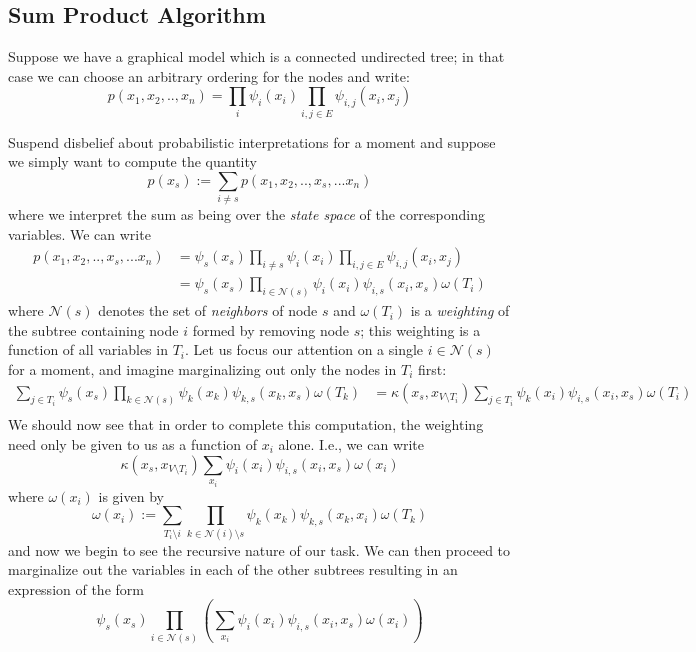 \subsection{Sum Product Algorithm}

Suppose we have a graphical model which is a connected undirected tree; in that case we can choose an arbitrary ordering for the nodes and write:
$$
p(x_1, x_2, .., x_n) = \prod_i \psi_i(x_i) \prod_{i, j \in E} \psi_{i,j}(x_i, x_j)
$$

Suspend disbelief about probabilistic interpretations for a moment and suppose we simply want to compute the quantity
$$
p(x_s) := \sum_{i \neq s} p(x_1, x_2, ..,x_s,... x_n)
$$
where we interpret the sum as being over the \emph{state space} of the corresponding variables.  We can write
\begin{equation*}
\begin{aligned}
p(x_1, x_2, ..,x_s,... x_n) &= \psi_s(x_s) \prod_{i\neq s} \psi_i(x_i) \prod_{i, j \in E} \psi_{i,j}(x_i, x_j)\\
&= \psi_s(x_s) \prod_{i \in \mathcal{N}(s)} \psi_i(x_i) \psi_{i,s}(x_i, x_s) \omega(T_i)
\end{aligned}
\end{equation*}
where $\mathcal{N}(s)$ denotes the set of \emph{neighbors} of node $s$ and $\omega(T_i)$ is a \emph{weighting} of the subtree containing node $i$ formed by removing node $s$; this weighting is a function of all variables in $T_i$.  Let us focus our attention on a single $i\in\mathcal{N}(s)$ for a moment, and imagine marginalizing out only the nodes in $T_i$ first:
\begin{equation*}
\begin{aligned}
\sum_{j\in T_i}\psi_s(x_s) \prod_{k \in \mathcal{N}(s)} \psi_k(x_k) \psi_{k,s}(x_k, x_s) \omega(T_k) &= \kappa(x_s, x_{V\setminus T_i}) \sum_{j\in T_i} \psi_k(x_i) \psi_{i,s}(x_i, x_s) \omega(T_i)\\
\end{aligned}
\end{equation*}
We should now see that in order to complete this computation, the weighting need only be given to us as a function of $x_i$ alone.  I.e., we can write
$$
\kappa(x_s, x_{V\setminus T_i}) \sum_{x_i} \psi_i(x_i) \psi_{i,s}(x_i, x_s) \omega(x_i)
$$
where $\omega(x_i)$ is given by
$$
\omega(x_i) := \sum_{T_i \setminus i}\prod_{k \in \mathcal{N}(i)\setminus {s}} \psi_k(x_k) \psi_{k,s}(x_k, x_i) \omega(T_k)
$$
and now we begin to see the recursive nature of our task.  We can then proceed to marginalize out the variables in each of the other subtrees resulting in an expression of the form
$$
\psi_s(x_s)\prod_{i\in\mathcal{N}(s)}\left( \sum_{x_i} \psi_i(x_i) \psi_{i,s}(x_i, x_s) \omega(x_i)\right)
$$

